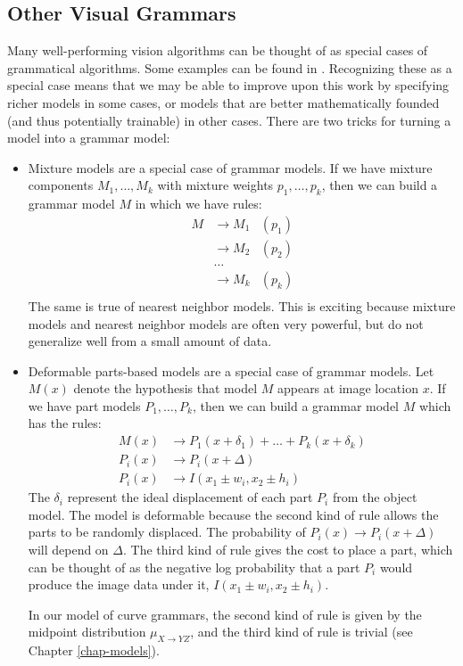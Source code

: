 \subsection{Other Visual Grammars}
\label{sec-other-grammars}

Many well-performing vision algorithms can be thought of as special
cases of grammatical algorithms. Some examples can be found in
\cite{pop, pictorial, grammar-tr}. Recognizing these as a special case
means that we may be able to improve upon this work by specifying
richer models in some cases, or models that are better mathematically
founded (and thus potentially trainable) in other cases. There are two
tricks for turning a model into a grammar model:
\begin{itemize}
\item Mixture models are a special case of grammar models. If we have
  mixture components $M_1,\dots,M_k$ with mixture weights
  $p_1,\dots,p_k$, then we can build a grammar model $M$ in which we
  have rules:
  \begin{align*}
    M &\to M_1 &(p_1)\\
     &\to M_2 &(p_2)\\
     &\dots&\\
     &\to M_k &(p_k)\\
  \end{align*}
  The same is true of nearest neighbor models. This is exciting
  because mixture models and nearest neighbor models are often very
  powerful, but do not generalize well from a small amount of data.

\item Deformable parts-based models are a special case of grammar
  models. \cite{grammar-tr} Let $M(x)$ denote the hypothesis that model $M$ appears at
  image location $x$. If we have part models $P_1,\dots,P_k$, then we
  can build a grammar model $M$ which has the rules:
  \begin{align*}
M(x) &\to P_1(x + \delta_1) + \dots + P_k(x + \delta_k)\\
P_i(x) &\to P_i(x+\Delta)\\
P_i(x) &\to I(x_1 \pm w_i, x_2 \pm h_i)
  \end{align*}
  The $\delta_i$ represent the ideal displacement of each part $P_i$
  from the object model. The model is deformable because the second
  kind of rule allows the parts to be randomly displaced. The
  probability of $P_i(x) \to P_i(x+\Delta)$ will depend on
  $\Delta$. The third kind of rule gives the cost to place a part,
  which can be thought of as the negative log probability that a part
  $P_i$ would produce the image data under it, $I(x_1\pm w_i, x_2\pm
  h_i)$.

  In our model of curve grammars, the second kind of rule is given
  by the midpoint distribution $\mu_{X\to YZ}$, and the third kind of
  rule is trivial (see Chapter \ref{chap-models}).
\end{itemize}

